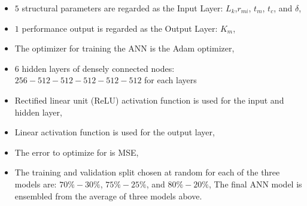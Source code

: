             
            \begin{itemize}
                \item $5$ structural parameters are regarded as the Input Layer: $L_k$,$r_{mi}$, $t_m$, $t_c$, and $\delta$,
                \item $1$ performance output is regarded as the Output Layer: $K_m$,
                \item The optimizer for training the \acs{ANN} is the Adam optimizer,
                \item $6$ hidden layers of densely connected nodes: $256-512-512-512-512-512$ for each layers
                \item Rectified linear unit (ReLU) activation function is used
for the input and hidden layer,
                \item Linear activation function is used for the output layer,
                \item The error to optimize for is \acs{MSE},
                \item The training and validation split chosen at random for each of the three models are: $70\%-30\%$, $75\%-25\%$, and $80\%-20\%$,
                The final \acs{ANN} model is ensembled from the average of three models above.
            \end{itemize}
            
